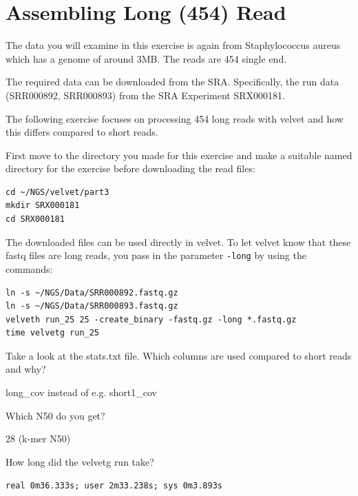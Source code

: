 \section{Assembling Long (454) Read}

\begin{note}
The data you will examine in this exercise is again from Staphylococcus aureus
which has a genome of around 3MB. The reads are 454 single end.

The required data can be downloaded from the SRA. Specifically, the run data
(SRR000892, SRR000893) from the SRA Experiment SRX000181.

\end{note}

\begin{information}
The following exercise focuses on processing 454 long reads with velvet and how
this differs compared to short reads.
\end{information}

\begin{steps}
First move to the directory you made for this exercise and make a suitable named
directory for the exercise before downloading the read files:
\begin{lstlisting}
cd ~/NGS/velvet/part3
mkdir SRX000181
cd SRX000181
\end{lstlisting}

The downloaded files can be used directly in velvet. To let velvet know that
these fastq files are long reads, you pass in the parameter \texttt{-long} by
using the commands:
\begin{lstlisting}
ln -s ~/NGS/Data/SRR000892.fastq.gz
ln -s ~/NGS/Data/SRR000893.fastq.gz
velveth run_25 25 -create_binary -fastq.gz -long *.fastq.gz
time velvetg run_25
\end{lstlisting}
\end{steps}

\begin{questions}
Take a look at the stats.txt file. Which columns are used compared to short reads and why?
\begin{answer}
long\_cov instead of e.g. short1\_cov
\end{answer}

Which N50 do you get?
\begin{answer}
28 (k-mer N50)
\end{answer}

How long did the velvetg run take?
\begin{answer}
\texttt{real    0m36.333s; user    2m33.238s; sys     0m3.893s}
\end{answer}
\end{questions}

